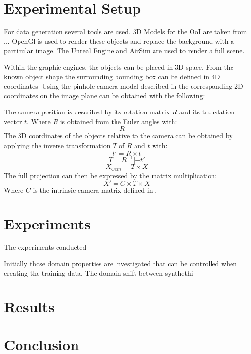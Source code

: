 \section{Experimental Setup}
\label{sec:training:setup}

For data generation several tools are used. 3D Models for the \ac{OoI} are taken from ... OpenGl is used to render these objects and replace the background with a particular image. The Unreal Engine and AirSim are used to render a full scene.

Within the graphic engines, the objects can be placed in 3D space. From the known object shape the surrounding bounding box can be defined in 3D coordinates. Using the pinhole camera model described in  the corresponding 2D coordinates on the image plane can be obtained with the following:

The camera position is described by its rotation matrix $R$ and its translation vector $t$. Where $R$ is obtained from the Euler angles with:
$$
R =
$$
The 3D coordinates of the objects relative to the camera can be obtained by applying the inverse transformation $T$ of $R$ and $t$ with:
$$
t' = R \times t
$$
$$
T = R^{-1}|-t'
$$
$$
X_{Cam} = T\times X
$$
The full projection can then be expressed by the matrix multiplication:
$$
X' = C\times T\times X
$$
Where $C$ is the intrinsic camera matrix defined in .



\section{Experiments}
\label{sec:training:experiments}


The experiments conducted

Initially those domain properties are investigated that can be controlled when creating the training data. The domain shift between synthethi







\section{Results}
\label{sec:training:results}

\section{Conclusion}
\label{sec:training:conclusion}

%
